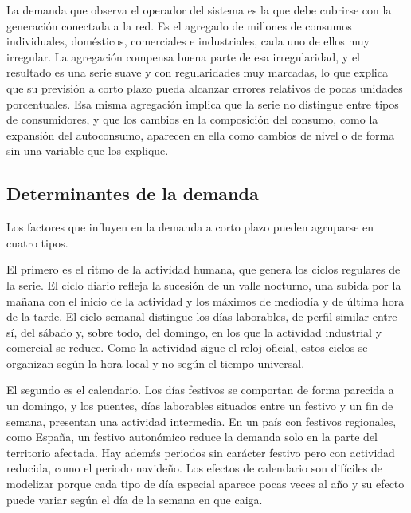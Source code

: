 La demanda que observa el operador del sistema es la que debe cubrirse con
la generación conectada a la red. Es el agregado de millones de consumos
individuales, domésticos, comerciales e industriales, cada uno de ellos muy
irregular. La agregación compensa buena parte de esa irregularidad, y el
resultado es una serie suave y con regularidades muy marcadas, lo que
explica que su previsión a corto plazo pueda alcanzar errores relativos de
pocas unidades porcentuales. Esa misma agregación implica que la serie no
distingue entre tipos de consumidores, y que los cambios en la composición
del consumo, como la expansión del autoconsumo, aparecen en ella como
cambios de nivel o de forma sin una variable que los explique.

\subsection{Determinantes de la demanda}\label{sec:determinantes}

Los factores que influyen en la demanda a corto plazo pueden agruparse en
cuatro tipos.

El primero es el ritmo de la actividad humana, que genera los ciclos
regulares de la serie. El ciclo diario refleja la sucesión de un valle
nocturno, una subida por la mañana con el inicio de la actividad y los
máximos de mediodía y de última hora de la tarde. El ciclo semanal distingue
los días laborables, de perfil similar entre sí, del sábado y, sobre todo,
del domingo, en los que la actividad industrial y comercial se reduce. Como
la actividad sigue el reloj oficial, estos ciclos se organizan según la hora
local y no según el tiempo universal.

El segundo es el calendario. Los días festivos se comportan de forma
parecida a un domingo, y los puentes, días laborables situados entre un
festivo y un fin de semana, presentan una actividad intermedia. En un país
con festivos regionales, como España, un festivo autonómico reduce la
demanda solo en la parte del territorio afectada. Hay además periodos sin
carácter festivo pero con actividad reducida, como el periodo navideño. Los
efectos de calendario son difíciles de modelizar porque cada tipo de día
especial aparece pocas veces al año y su efecto puede variar según el día de
la semana en que caiga.

